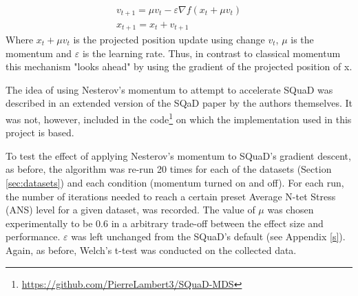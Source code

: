 \documentclass{l4proj}
\begin{document}
\begin{gather}  
    v_{t + 1} = \mu v_t  - \varepsilon \nabla f(x_t + \mu v_t) \\
    x_{t + 1} = x_t + v_{t+1}
\end{gather} 
Where $x_t + \mu v_t$ is the projected position update using change $v_t$, $\mu$ is the momentum and $\varepsilon$ is the learning rate. Thus, in contrast to classical momentum \citep{classical_momentum} this mechanism "looks ahead" by using the gradient of the projected position of x.

The idea of using Nesterov's momentum to attempt to accelerate SQuaD was described in an extended version of the SQaD paper \citep{squad} by the authors themselves. It was not, however, included in the code\footnote{ \url{https://github.com/PierreLambert3/SQuaD-MDS}} on which the implementation used in this project is based.

To test the effect of applying Nesterov's momentum to SQuaD's gradient descent, as before, the algorithm was re-run 20 times for each of the datasets (Section \ref{sec:datasets}) and each condition (momentum turned on and off). For each run, the number of iterations needed to reach a certain preset Average N-tet Stress (ANS) level for a given dataset, was recorded. The value of $\mu$ was chosen experimentally to be 0.6 in a arbitrary trade-off between the effect size and performance. $\varepsilon$  was left unchanged from the SQuaD's default (see Appendix  \ref{s}). Again, as before, Welch's t-test was conducted on the collected data.
\end{document}
